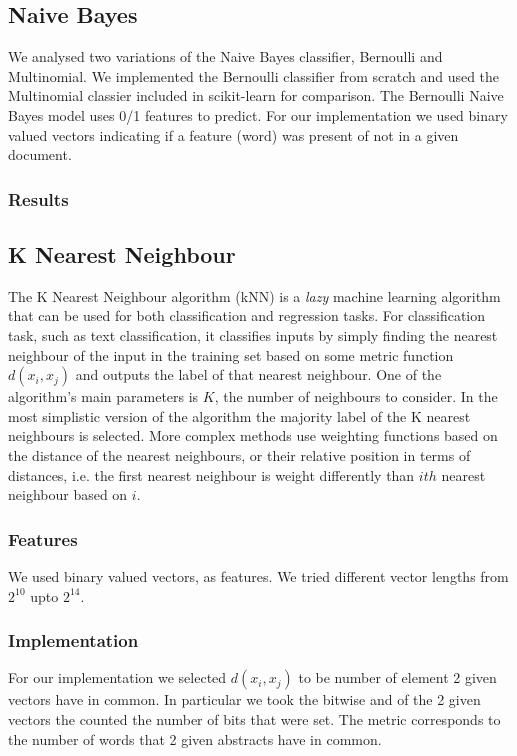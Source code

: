 \documentclass[10pt,twocolumn]{article}
\begin{document}
\subsection{Naive Bayes}
We analysed two variations of the Naive Bayes classifier, Bernoulli and Multinomial. We implemented the Bernoulli classifier from scratch and used the Multinomial classier included in scikit-learn for comparison. The Bernoulli Naive Bayes model uses 0/1 features to predict. For our implementation we used binary valued vectors indicating if a feature (word) was present of not in a given document.
\subsubsection{Results}
\subsection{K Nearest Neighbour}
The K Nearest Neighbour algorithm (kNN) is a \textit{lazy} machine learning algorithm that can be used for both classification and regression tasks. For classification task, such as text classification, it classifies inputs by simply finding the nearest neighbour of the input in the training set based on some metric function $d(x_i,x_j)$ and outputs the label of that nearest neighbour. One of the algorithm's main parameters is $K$, the number of neighbours to consider. In the most simplistic version of the algorithm the majority label of the K nearest neighbours is selected. More complex methods use weighting functions based on the distance of the nearest neighbours, or their relative position in terms of distances, i.e. the first nearest neighbour is weight differently than $ith$ nearest neighbour based on $i$.
\subsubsection{Features}
We used binary valued vectors, as features. We tried different vector lengths from $2^{10}$ upto $2^{14}$.
\subsubsection{Implementation}
For our implementation we selected $d(x_i,x_j)$ to be number of element 2 given vectors have in common. In particular we took the bitwise and of the 2 given vectors the counted the number of bits that were set. The metric corresponds to the number of words that 2 given abstracts have in common. 
\end{document}
